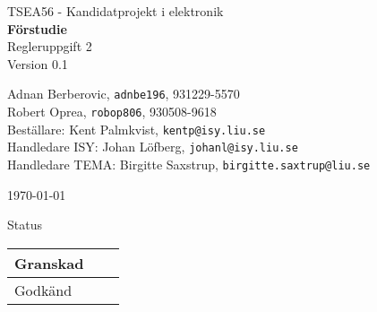 \documentclass[11pt]{article}
\date{} %
\begin{document}
	\begin{titlepage}
		\begin{center}
			TSEA56 - Kandidatprojekt i elektronik \\[0.5in]
			{\Large\bfseries Förstudie} \\ %
			\vspace{0.5\baselineskip}
			Regleruppgift 2\\
			\vspace{0.5\baselineskip}
			Version 0.1
			
			\vspace{2\baselineskip}
			
			Adnan Berberovic, \texttt{adnbe196}, 931229-5570 \\
		    Robert Oprea, \texttt{robop806}, 930508-9618 \\ %
		    
		    \vspace{4\baselineskip}
		    Beställare: Kent Palmkvist, \texttt{kentp@isy.liu.se}\\
		    Handledare ISY: Johan Löfberg, \texttt{johanl@isy.liu.se}\\
		    Handledare TEMA: Birgitte Saxstrup, \texttt{birgitte.saxtrup@liu.se}\\
			
			\vspace{3\baselineskip}
			
			\today	%
			\vspace{17\baselineskip}

			Status			
			\begin{longtable}{|l|l|l|} \hline
				
				Granskad &
				 & 
				 \\ \hline
				Godkänd &
				 &
				 \\ \hline
				
			\end{longtable}
		\end{center}
	\end{titlepage}
	
\end{document}
